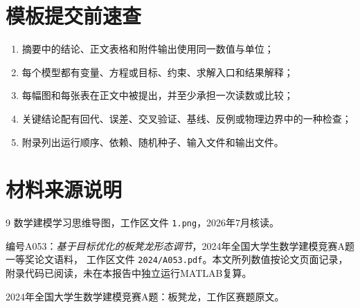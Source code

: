 \documentclass[UTF8,zihao=-4]{ctexart}
\begin{document}
\appendix
\section{模板提交前速查}

\begin{enumerate}
  \item 摘要中的结论、正文表格和附件输出使用同一数值与单位；
  \item 每个模型都有变量、方程或目标、约束、求解入口和结果解释；
  \item 每幅图和每张表在正文中被提出，并至少承担一次读数或比较；
  \item 关键结论配有回代、误差、交叉验证、基线、反例或物理边界中的一种检查；
  \item 附录列出运行顺序、依赖、随机种子、输入文件和输出文件。
\end{enumerate}

\section*{材料来源说明}

\begin{thebibliography}{9}
数学建模学习思维导图，工作区文件 \texttt{1.png}，2026年7月核读。

编号A053：\emph{基于目标优化的板凳龙形态调节}，2024年全国大学生数学建模竞赛A题一等奖论文语料，
工作区文件 \texttt{2024/A053.pdf}。本文所列数值按论文页面记录，附录代码已阅读，未在本报告中独立运行MATLAB复算。

2024年全国大学生数学建模竞赛A题：板凳龙，工作区赛题原文。
\end{thebibliography}
\end{document}
